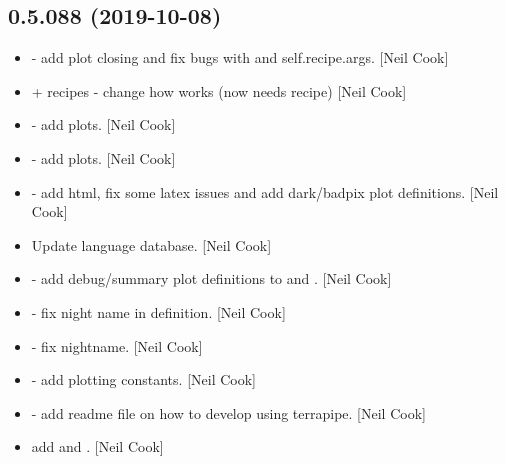 \documentclass[a4paper,10pt,english]{report}
\begin{document}
\subsection{0.5.088 (2019-10-08)}
\label{\detokenize{misc/changelog:id55}}\begin{itemize}
\item {} 
 - add plot closing and fix bugs
with  and self.recipe.args. {[}Neil Cook{]}

\item {} 
 +  recipes - change how  works
(now needs recipe) {[}Neil Cook{]}

\item {} 
 - add plots. {[}Neil Cook{]}

\item {} 
 - add plots. {[}Neil Cook{]}

\item {} 
 - add html, fix some latex issues and add dark/badpix
plot definitions. {[}Neil Cook{]}

\item {} 
Update language database. {[}Neil Cook{]}

\item {} 
 - add debug/summary plot
definitions to  and . {[}Neil Cook{]}

\item {} 
 - fix night name in
 definition. {[}Neil Cook{]}

\item {} 
 - fix nightname. {[}Neil Cook{]}

\item {} 
 - add plotting constants. {[}Neil Cook{]}

\item {} 
 - add readme file on how to develop using
terrapipe. {[}Neil Cook{]}

\item {} 
 add  and .
{[}Neil Cook{]}

\end{itemize}
\end{document}
